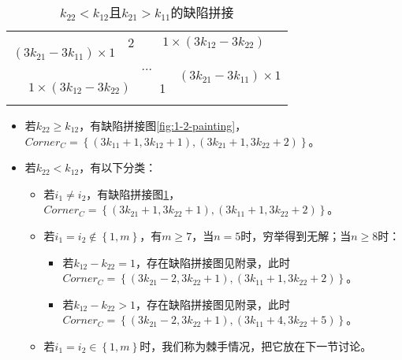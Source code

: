 \begin{table}[htbp]
	\centering
	\caption{$k_{22} < k_{12}$且$k_{21} > k_{11}$的缺陷拼接}
	\begin{tabular}{|cc|ccc|cc|}
		\hline
		\multicolumn{2}{|c|}{\multirow{3}{*}{$(3k_{21} - 3k_{11}) \times 1$}} & 2 & \multicolumn{4}{|c|}{$1 \times  (3k_{12} - 3k_{22})$}                                                                                 \\
		\cline{3-7}
		                                                                      &   & \multicolumn{3}{c}{\multirow{2}{*}{...}}              & \multicolumn{2}{|c|}{\multirow{3}{*}{$(3k_{21} - 3k_{11}) \times 1$}}         \\
		                                                                      &   &                                                       &                                                                       &  &  & \\
		\cline{1-5}
		\multicolumn{4}{|c|}{$1 \times  (3k_{12} - 3k_{22})$}                 & 1 &                                                       &                                                                               \\
		\hline
		\label{fig:2-1-painting-1}
	\end{tabular}
\end{table}

\begin{itemize}
	\item 若$k_{22} \ge k_{12}$，有缺陷拼接图\ref*{fig:1-2-painting}，\\
	      $Corner_C = \left\{(3k_{11} + 1, 3k_{12} + 1), (3k_{21} + 1, 3k_{22} + 2)\right\}$。
	\item 若$k_{22} < k_{12}$，有以下分类：
	      \begin{itemize}
		      \item 若$i_1 \neq i_2$，有缺陷拼接图\ref*{fig:2-1-painting-1}，\\
		            $Corner_C = \left\{(3k_{21} + 1, 3k_{22} + 1), (3k_{11} + 1, 3k_{22} + 2)\right\}$。
		      \item 若$i_1 = i_2 \notin \left\{1, m\right\}$，有$m \ge 7$，当$n = 5$时，穷举得到无解；当$n \ge 8$时：
		            \begin{itemize}
			            \item 若$k_{12} - k_{22} = 1$，存在缺陷拼接图见附录，此时\\
			                  $Corner_C = \left\{(3k_{21} - 2, 3k_{22} + 1), (3k_{11} + 1, 3k_{22} + 2)\right\}$。
			            \item 若$k_{12} - k_{22} > 1$，存在缺陷拼接图见附录，此时\\
			                  $Corner_C = \left\{(3k_{21} - 2, 3k_{22} + 1), (3k_{11} + 4, 3k_{22} + 5)\right\}$。
		            \end{itemize}
		      \item 若$i_1 = i_2 \in \left\{1, m\right\}$时，我们称为棘手情况，把它放在下一节讨论。
	      \end{itemize}
\end{itemize}


